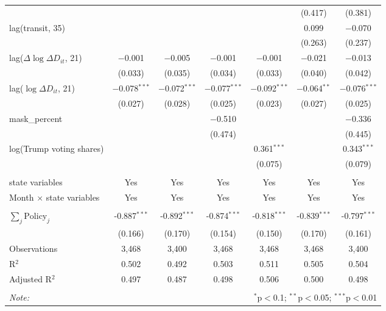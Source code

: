 \begin{tabular}{@{\extracolsep{1pt}}lcccccc}
  &  &  &  &  & (0.417) & (0.381) \\ 
  lag(transit, 35) &  &  &  &  & 0.099 & $-$0.070 \\ 
  &  &  &  &  & (0.263) & (0.237) \\ 
  lag($\Delta \log \Delta D_{it}$, 21) & $-$0.001 & $-$0.005 & $-$0.001 & $-$0.001 & $-$0.021 & $-$0.013 \\ 
  & (0.033) & (0.035) & (0.034) & (0.033) & (0.040) & (0.042) \\ 
  lag($\log \Delta D_{it}$, 21) & $-$0.078$^{***}$ & $-$0.072$^{***}$ & $-$0.077$^{***}$ & $-$0.092$^{***}$ & $-$0.064$^{**}$ & $-$0.076$^{***}$ \\ 
  & (0.027) & (0.028) & (0.025) & (0.023) & (0.027) & (0.025) \\ 
  mask\_percent &  &  & $-$0.510 &  &  & $-$0.336 \\ 
  &  &  & (0.474) &  &  & (0.445) \\ 
  log(Trump voting shares) &  &  &  & 0.361$^{***}$ &  & 0.343$^{***}$ \\ 
  &  &  &  & (0.075) &  & (0.079) \\ 
 \hline \\[-1.8ex] 
state variables & Yes & Yes & Yes & Yes & Yes & Yes \\ 
Month $\times$ state variables & Yes & Yes & Yes & Yes & Yes & Yes \\ 
\hline \\[-1.8ex] 
$\sum_j \mathrm{Policy}_j$ & -0.887$^{***}$ & -0.892$^{***}$ & -0.874$^{***}$ & -0.818$^{***}$ & -0.839$^{***}$ & -0.797$^{***}$ \\ 
 & (0.166) & (0.170) & (0.154) & (0.150) & (0.170) & (0.161) \\ 
Observations & 3,468 & 3,400 & 3,468 & 3,468 & 3,468 & 3,400 \\ 
R$^{2}$ & 0.502 & 0.492 & 0.503 & 0.511 & 0.505 & 0.504 \\ 
Adjusted R$^{2}$ & 0.497 & 0.487 & 0.498 & 0.506 & 0.500 & 0.498 \\ 
\hline 
\hline \\[-1.8ex] 
\textit{Note:}  & \multicolumn{6}{r}{$^{*}$p$<$0.1; $^{**}$p$<$0.05; $^{***}$p$<$0.01} \\ 
\end{tabular} 